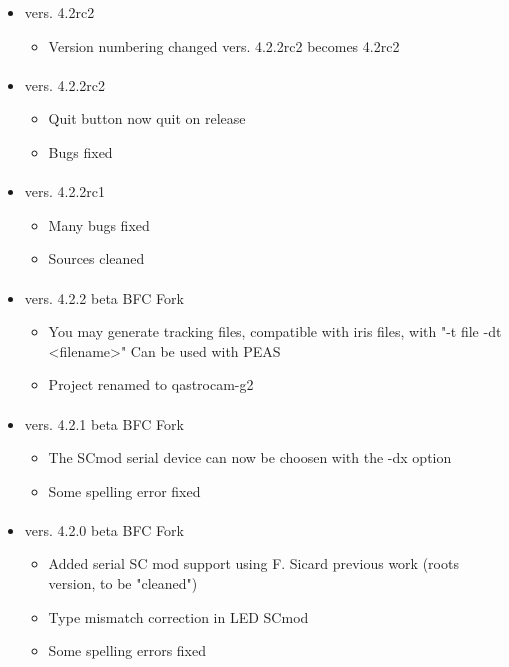 \documentclass[11pt,a4paper]{book}
\begin{document}
\begin{itemize}
\paragraph*{}
\item vers. 4.2rc2
\begin{itemize}
\item Version numbering changed vers. 4.2.2rc2 becomes 4.2rc2
\end{itemize}
\paragraph*{}
\item vers. 4.2.2rc2
\begin{itemize}
\item Quit button now quit on release
\item Bugs fixed
\end{itemize}
\paragraph*{}
\item vers. 4.2.2rc1
\begin{itemize}
\item Many bugs fixed
\item Sources cleaned
\end{itemize}
\paragraph*{}
\item vers. 4.2.2 beta BFC Fork
\begin{itemize}
\item You may generate tracking files, compatible with iris files, with "-t file -dt <filename>"
  Can be used with PEAS
\item Project renamed to qastrocam-g2
\end{itemize}
\paragraph*{}
\item vers. 4.2.1 beta BFC Fork
\begin{itemize}
\item The SCmod serial device can now be choosen with the -dx option
\item Some spelling error fixed
\end{itemize}
\paragraph*{}
\item vers. 4.2.0 beta BFC Fork
\begin{itemize}
\item Added serial SC mod support using F. Sicard previous work (roots version, to be "cleaned")
\item Type mismatch correction in LED SCmod
\item Some spelling errors fixed
\end{itemize}

\end{itemize}
\end{document}
